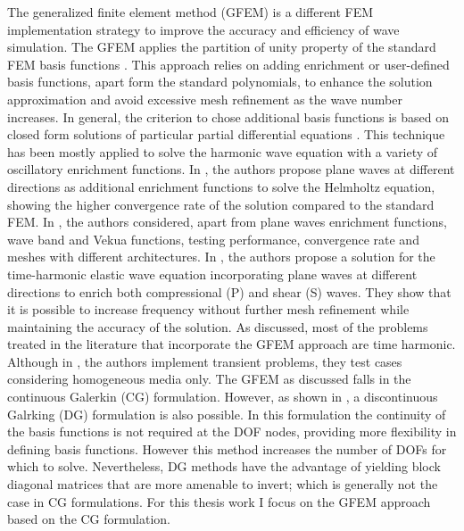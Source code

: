 The generalized finite element method (GFEM) is a different FEM implementation strategy to improve the accuracy and efficiency of wave simulation. The GFEM applies the  partition of unity property of the standard FEM basis functions \cite{BABUSKA1997}. This approach relies on adding enrichment or user-defined basis functions,  apart form the standard polynomials, to enhance the solution approximation and  avoid excessive mesh refinement as the wave number increases. In general, the criterion to chose  additional basis functions is based on closed form solutions of particular partial differential equations \cite{Strouboulis2000, Babuska1997a}. This technique has been mostly applied to solve the  harmonic wave equation with a variety of oscillatory enrichment functions. In \cite{Strouboulis2006, Babuska1997a}, the authors propose plane waves at different directions as  additional enrichment functions to solve the Helmholtz equation,  showing the higher convergence rate of the solution compared to the standard FEM. In \cite{Strouboulis2008}, the authors  considered, apart from  plane waves enrichment functions,  wave band and Vekua functions, testing performance, convergence rate and meshes with different architectures. In \cite{ElKacimi2009}, the authors propose a solution for the time-harmonic elastic wave equation incorporating plane waves at different directions to enrich both compressional (P) and shear (S) waves. They show that it is possible to increase frequency without further mesh refinement while maintaining  the accuracy of the solution. As discussed, most of the problems treated in the literature that incorporate the GFEM approach are time harmonic. Although in \cite{Ham2012},  the authors implement transient problems, they test cases considering homogeneous media only. The GFEM as discussed falls in the continuous Galerkin (CG) formulation. However, as shown in \cite{Hiptmair2016}, a discontinuous Galrking (DG) formulation is also possible. In this formulation the continuity of the basis functions is not required at the DOF nodes, providing more flexibility in defining basis functions. However this method increases the number of DOFs for which to solve. Nevertheless, DG methods have the advantage of yielding block diagonal matrices that are more amenable to invert; which is generally not the case in CG formulations. For this thesis work I focus on the GFEM approach based on the CG formulation.

